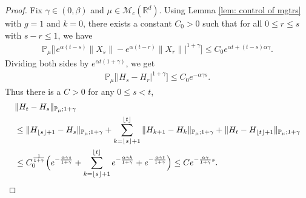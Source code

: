 \documentclass[12pt,a4paper]{amsart}
\theoremstyle{plain}
\theoremstyle{definition}
\numberwithin{equation}{section}
\begin{document}
\begin{proof}
     Fix $\gamma \in (0,\beta)$ and $\mu\in \mathcal M_c(\mathbb R^d)$.
     Using Lemma \ref{lem: control of mgtrs} with $g=1$ and $k=0$, there exists a constant $C_0>0$ such that for all $0\leq r\leq s $ with $s-r\leq1$, we have
    \begin{equation}\begin{split}
        \mathbb{P}_{\mu}\big[\big|e^{\alpha(t-s)}\|X_s\|-e^{\alpha(t-r)}\|X_r\|\big|^{1+\gamma}\big]
        \leq C_0e^{\alpha t+(t-s)\alpha\gamma}.
    \end{split}\end{equation}
    Dividing both sides by $e^{\alpha t(1+\gamma)}$, we get
    \begin{equation}\begin{split}
        \mathbb{P}_{\mu}\big[|H_s-H_r|^{1+\gamma}\big]\leq  C_0 e^{-\alpha \gamma s}.
    \end{split}\end{equation}
    Thus there is a $C>0$ for any $0\leq s<t$,
\begin{equation}\begin{split}
	& \|H_t-H_s\|_{\mathbb{P}_{\mu};1+\gamma}
	\\&\leq \|H_{\lfloor s \rfloor+1}-H_s\|_{\mathbb{P}_{\mu};1+\gamma}+\sum_{k=\lfloor s \rfloor+1}^{\lfloor t \rfloor}\|H_{k+1}-H_{k}\|_{\mathbb{P}_{\mu};1+\gamma}+\|H_t-H_{\lfloor t \rfloor+1}\|_{\mathbb{P}_{\mu};1+\gamma}
	\\& \leq C_0^{\frac{1}{1+\gamma}} \Big(e^{-\frac{\alpha \gamma s}{1+\gamma}}+\sum_{k=\lfloor s \rfloor+1}^{\lfloor t \rfloor}e^{-\frac{\alpha \gamma k}{1+\gamma}}+ e^{-\frac{\alpha \gamma t}{1+\gamma}}\Big)
	\leq Ce^{-\frac{\alpha \gamma}{1+\gamma}s}.
    \qedhere
\end{split}\end{equation}	
\end{proof}
\end{document}
